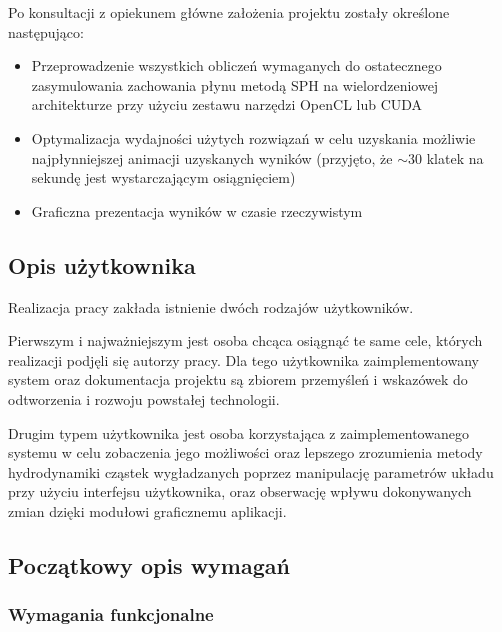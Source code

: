 \documentclass[polish, 12pt]{aghthesis}
\begin{document}
	Po konsultacji z opiekunem główne założenia projektu zostały określone następująco:
	
	\begin{itemize}
	
		\item Przeprowadzenie wszystkich obliczeń wymaganych do ostatecznego zasymulowania zachowania płynu metodą SPH na wielordzeniowej architekturze przy użyciu zestawu narzędzi OpenCL lub CUDA
				
		\item Optymalizacja wydajności użytych rozwiązań w celu uzyskania możliwie najpłynniejszej animacji uzyskanych wyników (przyjęto, że $\sim 30$ klatek na sekundę jest wystarczającym osiągnięciem)
		
		\item Graficzna prezentacja wyników w czasie rzeczywistym
		
	\end{itemize}
	
	
	\subsection{Opis użytkownika}
	
	Realizacja pracy zakłada istnienie dwóch rodzajów użytkowników.
	
	Pierwszym i najważniejszym jest osoba chcąca osiągnąć te same cele, których realizacji podjęli się autorzy pracy. Dla tego użytkownika zaimplementowany system oraz dokumentacja projektu są zbiorem przemyśleń i wskazówek do odtworzenia i rozwoju powstałej technologii.
	
	Drugim typem użytkownika jest osoba korzystająca z zaimplementowanego systemu w celu zobaczenia jego możliwości oraz lepszego zrozumienia metody hydrodynamiki cząstek wygładzanych poprzez manipulację parametrów układu przy użyciu interfejsu użytkownika, oraz obserwację wpływu dokonywanych zmian dzięki modułowi graficznemu aplikacji.
	
	\subsection{Początkowy opis wymagań}
	
		\subsubsection{Wymagania funkcjonalne}
		
\end{document}
